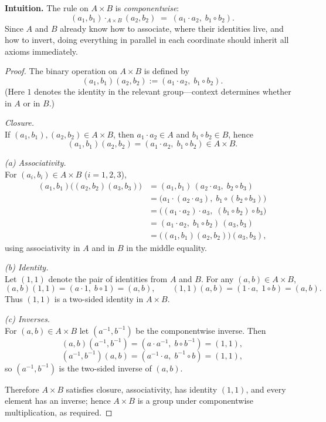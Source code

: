 \documentclass[12pt]{article}
\theoremstyle{definition}
\begin{document}
\dotfill

\noindent
\textbf{Intuition.}
The rule on $A\times B$ is \emph{componentwise}:
\[
(a_1,b_1)\cdot_{A\times B}(a_2,b_2) \;=\; (a_1\cdot a_2,\; b_1\circ b_2).
\]
Since $A$ and $B$ already know how to associate, where their identities live, and how to invert,
doing everything in parallel in each coordinate should inherit all axioms immediately.

\dotfill

\begin{proof}
The binary operation on $A\times B$ is defined by
\[
(a_1,b_1)(a_2,b_2):=(a_1\cdot a_2,\; b_1\circ b_2).
\]
(Here $1$ denotes the identity in the relevant group—context determines whether in $A$ or in $B$.)

\dotfill

\noindent\emph{Closure.}\\

\noindent
If $(a_1,b_1),(a_2,b_2)\in A\times B$, then $a_1\cdot a_2\in A$ and $b_1\circ b_2\in B$, hence
\[
(a_1,b_1)(a_2,b_2)=(a_1\cdot a_2,\; b_1\circ b_2)\in A\times B.
\]

\dotfill

\noindent\emph{(a) Associativity.}\\

\noindent
For $(a_i,b_i)\in A\times B$ ($i=1,2,3$),
\[
\begin{aligned}
(a_1,b_1)\big((a_2,b_2)(a_3,b_3)\big)
&= (a_1,b_1)\,(a_2\cdot a_3,\; b_2\circ b_3) \\
&= \big(a_1\cdot (a_2\cdot a_3),\; b_1\circ (b_2\circ b_3)\big) \\
&= \big((a_1\cdot a_2)\cdot a_3,\; (b_1\circ b_2)\circ b_3\big) \\
&= (a_1\cdot a_2,\; b_1\circ b_2)\,(a_3,b_3) \\
&= \big((a_1,b_1)(a_2,b_2)\big)(a_3,b_3),
\end{aligned}
\]
using associativity in $A$ and in $B$ in the middle equality.

\dotfill

\noindent\emph{(b) Identity.}\\

\noindent
Let $(1,1)$ denote the pair of identities from $A$ and $B$. For any $(a,b)\in A\times B$,
\[
(a,b)(1,1)=(a\cdot 1,\; b\circ 1)=(a,b),
\qquad
(1,1)(a,b)=(1\cdot a,\; 1\circ b)=(a,b).
\]
Thus $(1,1)$ is a two-sided identity in $A\times B$.

\dotfill

\noindent\emph{(c) Inverses.}\\

\noindent
For $(a,b)\in A\times B$ let $(a^{-1},b^{-1})$ be the componentwise inverse. Then
\[
(a,b)(a^{-1},b^{-1})=(a\cdot a^{-1},\; b\circ b^{-1})=(1,1),
\]
\[
(a^{-1},b^{-1})(a,b)=(a^{-1}\cdot a,\; b^{-1}\circ b)=(1,1),
\]
so $(a^{-1},b^{-1})$ is the two-sided inverse of $(a,b)$.

\dotfill

\noindent
Therefore $A\times B$ satisfies closure, associativity, has identity $(1,1)$, and every element has an inverse;
hence $A\times B$ is a group under componentwise multiplication, as required.
\end{proof}
\end{document}
